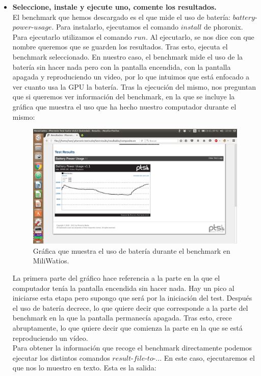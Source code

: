 \begin{itemize}
	\item \textbf{Seleccione, instale y ejecute uno, comente los resultados.}\\
	El benchmark que hemos descargado es el que mide el uso de batería: $battery$-$power$-$usage$. Para instalarlo, ejecutamos el comando $install$ de phoronix. Para ejecutarlo utilizamos el comando $run$. Al ejecutarlo, se nos dice con que nombre queremos que se guarden los resultados. Tras esto, ejecuta el benchmark seleccionado. En nuestro caso, el benchmark mide el uso de la batería sin hacer nada pero con la pantalla encendida, con la pantalla apagada y reproduciendo un video, por lo que intuimos que está enfocado a ver cuanto usa la GPU la batería. Tras la ejecución del mismo, nos preguntan que si queremos ver información del benchmark, en la que se incluye la gráfica que muestra el uso que ha hecho nuestro computador durante el mismo:\\
	\begin{figure}[H]
		\centering
		\includegraphics[width=0.7\linewidth]{Grafico_resultados_phorenix}
		\caption[Grafico benchmark]{Gráfica que muestra el uso de batería durante el benchmark en MiliWatios.}
		\label{fig:Grafico_resultados_phorenix}
	\end{figure}
	
	La primera parte del gráfico hace referencia a la parte en la que el computador tenía la pantalla encendida sin hacer nada. Hay un pico al iniciarse esta etapa pero supongo que será por la iniciación del test. Después el uso de batería decrece, lo que quiere decir que corresponde a la parte del benchmark en la que la pantalla permanecía apagada. Tras esto, crece abruptamente, lo que quiere decir que comienza la parte en la que se está reproduciendo un vídeo. \\
	
	Para obtener la información que recoge el benchmark directamente podemos ejecutar los distintos comandos $result$-$file$-$to$-... En este caso, ejecutaremos el que nos lo muestro en texto. Esta es la salida:\\
	

\end{itemize}
